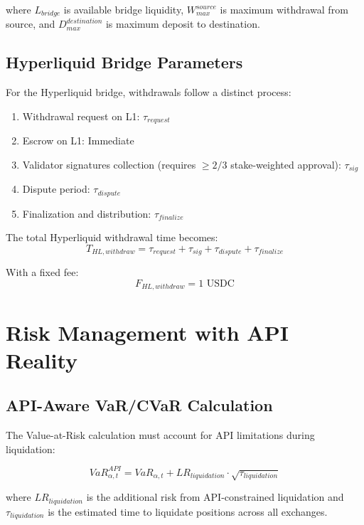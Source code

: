 \documentclass{article}
\begin{document}
where $L_{bridge}$ is available bridge liquidity, $W_{max}^{source}$ is maximum withdrawal from source, and $D_{max}^{destination}$ is maximum deposit to destination.

\subsection{Hyperliquid Bridge Parameters}

For the Hyperliquid bridge, withdrawals follow a distinct process:
\begin{enumerate}
    \item Withdrawal request on L1: $\tau_{request}$
    \item Escrow on L1: Immediate
    \item Validator signatures collection (requires $\geq 2/3$ stake-weighted approval): $\tau_{sig}$
    \item Dispute period: $\tau_{dispute}$
    \item Finalization and distribution: $\tau_{finalize}$
\end{enumerate}

The total Hyperliquid withdrawal time becomes:
\begin{equation}
T_{HL,withdraw} = \tau_{request} + \tau_{sig} + \tau_{dispute} + \tau_{finalize}
\end{equation}

With a fixed fee:
\begin{equation}
F_{HL,withdraw} = 1 \text{ USDC}
\end{equation}

\section{Risk Management with API Reality}

\subsection{API-Aware VaR/CVaR Calculation}

The Value-at-Risk calculation must account for API limitations during liquidation:

\begin{equation}
VaR_{\alpha,t}^{API} = VaR_{\alpha,t} + LR_{liquidation} \cdot \sqrt{\tau_{liquidation}}
\end{equation}

where $LR_{liquidation}$ is the additional risk from API-constrained liquidation and $\tau_{liquidation}$ is the estimated time to liquidate positions across all exchanges.
\end{document}
